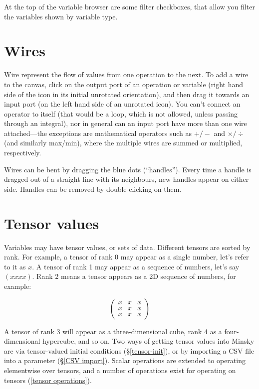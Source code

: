 At the top of the variable browser are some filter checkboxes, that
allow you filter the variables shown by variable type.

\section{Wires}

Wire represent the flow of values from one operation to the next.
To add a wire to the canvas, click on the output port of an operation
or variable (right hand side of the icon in its initial unrotated
orientation), and then drag it towards an input port (on the left
hand side of an unrotated icon). You can't connect an operator to
itself (that would be a loop, which is not allowed, unless passing
through an integral), nor in general can an input port have more than
one wire attached---the exceptions are mathematical operators such
as $+/-$ and $\times/\div$ (and similarly max/min), where the multiple
wires are summed or multiplied, respectively.

Wires can be bent by dragging the blue dots (``handles''). Every
time a handle is dragged out of a straight line with its neighbours,
new handles appear on either side. Handles can be removed by double-clicking
on them.

\section{Tensor values}

\label{tensors}

Variables may have tensor values, or sets of data. Different tensors
are sorted by rank. For example, a tensor of rank 0 may appear as
a single number, let's refer to it as $x$. A tensor of rank 1 may
appear as a sequence of numbers, let's say $(xxxx)$. Rank 2 means
a tensor appears as a 2D sequence of numbers, for example:

\[
\left(\begin{array}{ccc}
x & x & x\\
x & x & x\\
x & x & x
\end{array}\right)
\]

A tensor of rank 3 will appear as a three-dimensional cube, rank 4
as a four-dimensional hypercube, and so on. Two ways of getting tensor
values into Minsky are via tensor-valued initial conditions (\S\ref{tensor-init}),
or by importing a CSV file into a parameter (\S\ref{CSV import}).
Scalar operations are extended to operating elementwise over tensors,
and a number of operations exist for operating on tensors (\ref{tensor   operations}).

